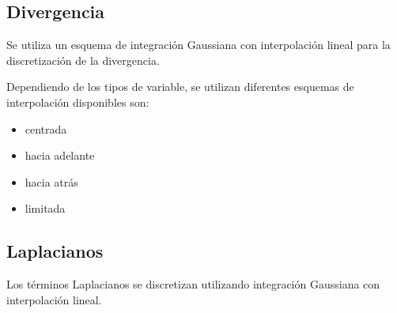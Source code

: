 \subsection{Divergencia}
%
Se utiliza un esquema de integración Gaussiana con interpolación lineal para
la discretización de la divergencia.

Dependiendo de los tipos de variable, se utilizan diferentes esquemas de
interpolación disponibles son:
%
\begin{itemize}
        \item centrada
        \item hacia adelante
        \item hacia atrás
        \item limitada
\end{itemize}

\subsection{Laplacianos}
%
Los términos Laplacianos se discretizan utilizando integración Gaussiana con
interpolación lineal.
